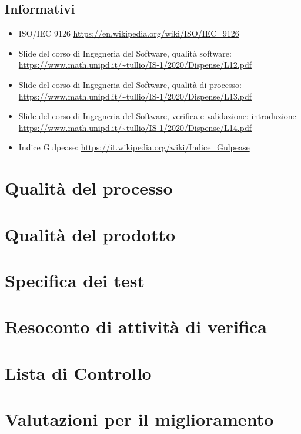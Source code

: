 \documentclass{article}
\begin{document}
\subsection{Informativi}%
\label{sub:info}
\begin{itemize}
\item ISO/IEC 9126 \url{https://en.wikipedia.org/wiki/ISO/IEC_9126}
\item Slide del corso di Ingegneria del Software, qualità software: \url{https://www.math.unipd.it/~tullio/IS-1/2020/Dispense/L12.pdf}
\item Slide del corso di Ingegneria del Software, qualità di processo: \url{https://www.math.unipd.it/~tullio/IS-1/2020/Dispense/L13.pdf}
\item Slide del corso di Ingegneria del Software, verifica e validazione: introduzione \url{https://www.math.unipd.it/~tullio/IS-1/2020/Dispense/L14.pdf}
\item Indice Gulpease: \url{https://it.wikipedia.org/wiki/Indice_Gulpease}
\end{itemize}


\newpage
\section{Qualità del processo}
\label{sec:qproc}


\newpage
\section{Qualità del prodotto}
\label{sec:qprod}


\newpage

\section{Specifica dei test}
\label{sec:spectest}


\newpage
\section{Resoconto di attività di verifica}
\label{sec:resoconto}


\newpage
\section{Lista di Controllo}
\label{sec:lista}


\newpage
\section{Valutazioni per il miglioramento}
\label{sec:valutazioni}

\end{document}
